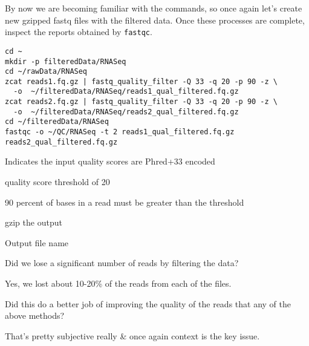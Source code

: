 \begin{steps}
By now we are becoming familiar with the commands, so once again let's create new gzipped fastq files with the filtered data.
Once these processes are complete, inspect the reports obtained by \texttt{fastqc}.\\
\begin{minipage}{\textwidth}
\begin{lstlisting}
cd ~
mkdir -p filteredData/RNASeq
cd ~/rawData/RNASeq
zcat reads1.fq.gz | fastq_quality_filter -Q 33 -q 20 -p 90 -z \
  -o  ~/filteredData/RNASeq/reads1_qual_filtered.fq.gz
zcat reads2.fq.gz | fastq_quality_filter -Q 33 -q 20 -p 90 -z \
  -o  ~/filteredData/RNASeq/reads2_qual_filtered.fq.gz
cd ~/filteredData/RNASeq
fastqc -o ~/QC/RNASeq -t 2 reads1_qual_filtered.fq.gz reads2_qual_filtered.fq.gz
\end{lstlisting}
\end{minipage}
\end{steps}

\begin{note}
\begin{description}[style=multiline,labelindent=0cm,align=right,leftmargin=0.8\descriptionlabelspace,rightmargin=1.5cm,font=\ttfamily]
\item[-Q 33] Indicates the input quality scores are Phred+33 encoded
\item[-q 20] quality score threshold of 20
\item[-p 90] 90 percent of bases in a read must be greater than the threshold
\item[-z] gzip the output
\item[-o] Output file name
\end{description}
\end{note}

\begin{questions}
Did we lose a significant number of reads by filtering the data? \\
\begin{answer}
Yes, we lost about 10-20\% of the reads from each of the files. \\
\end{answer}

Did this do a better job of improving the quality of the reads that any of the above methods? \\
\begin{answer}
That's pretty subjective really \& once again context is the key issue. \\
\end{answer}
\end{questions}

